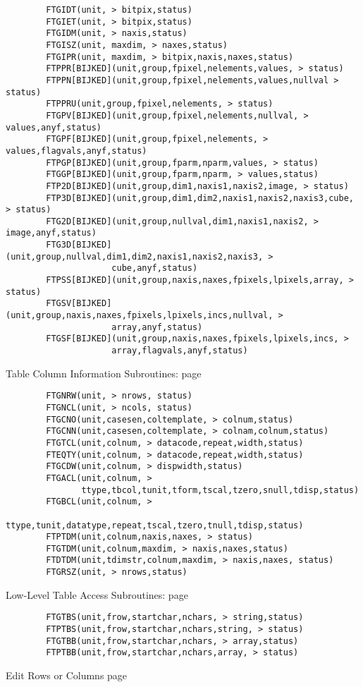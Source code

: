\documentclass[11pt]{book}
\begin{document}
\begin{verbatim}
        FTGIDT(unit, > bitpix,status)
        FTGIET(unit, > bitpix,status)
        FTGIDM(unit, > naxis,status)
        FTGISZ(unit, maxdim, > naxes,status)
        FTGIPR(unit, maxdim, > bitpix,naxis,naxes,status)
        FTPPR[BIJKED](unit,group,fpixel,nelements,values, > status)
        FTPPN[BIJKED](unit,group,fpixel,nelements,values,nullval > status)
        FTPPRU(unit,group,fpixel,nelements, > status)
        FTGPV[BIJKED](unit,group,fpixel,nelements,nullval, > values,anyf,status)
        FTGPF[BIJKED](unit,group,fpixel,nelements, > values,flagvals,anyf,status)
        FTPGP[BIJKED](unit,group,fparm,nparm,values, > status)
        FTGGP[BIJKED](unit,group,fparm,nparm, > values,status)
        FTP2D[BIJKED](unit,group,dim1,naxis1,naxis2,image, > status)
        FTP3D[BIJKED](unit,group,dim1,dim2,naxis1,naxis2,naxis3,cube, > status)
        FTG2D[BIJKED](unit,group,nullval,dim1,naxis1,naxis2, > image,anyf,status)
        FTG3D[BIJKED](unit,group,nullval,dim1,dim2,naxis1,naxis2,naxis3, >
                     cube,anyf,status)
        FTPSS[BIJKED](unit,group,naxis,naxes,fpixels,lpixels,array, > status)
        FTGSV[BIJKED](unit,group,naxis,naxes,fpixels,lpixels,incs,nullval, >
                     array,anyf,status)
        FTGSF[BIJKED](unit,group,naxis,naxes,fpixels,lpixels,incs, >
                     array,flagvals,anyf,status)
\end{verbatim}
 Table Column Information Subroutines: page~\pageref{FTGCNO}

\begin{verbatim}
        FTGNRW(unit, > nrows, status)
        FTGNCL(unit, > ncols, status)
        FTGCNO(unit,casesen,coltemplate, > colnum,status)
        FTGCNN(unit,casesen,coltemplate, > colnam,colnum,status)
        FTGTCL(unit,colnum, > datacode,repeat,width,status)
        FTEQTY(unit,colnum, > datacode,repeat,width,status)
        FTGCDW(unit,colnum, > dispwidth,status)
        FTGACL(unit,colnum, >
               ttype,tbcol,tunit,tform,tscal,tzero,snull,tdisp,status)
        FTGBCL(unit,colnum, >
               ttype,tunit,datatype,repeat,tscal,tzero,tnull,tdisp,status)
        FTPTDM(unit,colnum,naxis,naxes, > status)
        FTGTDM(unit,colnum,maxdim, > naxis,naxes,status)
        FTDTDM(unit,tdimstr,colnum,maxdim, > naxis,naxes, status)
        FTGRSZ(unit, > nrows,status)
\end{verbatim}
 Low-Level Table Access Subroutines: page~\pageref{FTGTBS}

\begin{verbatim}
        FTGTBS(unit,frow,startchar,nchars, > string,status)
        FTPTBS(unit,frow,startchar,nchars,string, > status)
        FTGTBB(unit,frow,startchar,nchars, > array,status)
        FTPTBB(unit,frow,startchar,nchars,array, > status)
\end{verbatim}
 Edit Rows or Columns page~\pageref{FTIROW}
\end{document}
